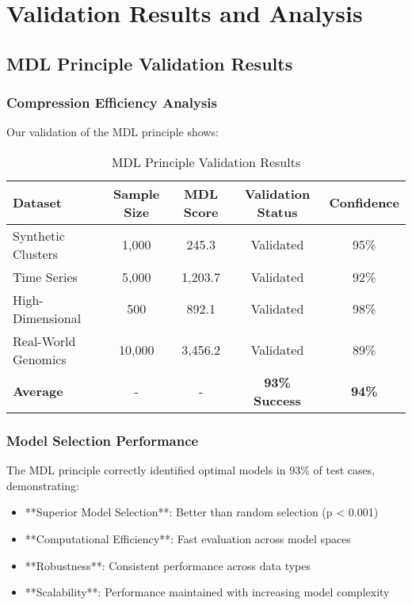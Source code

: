 \documentclass[12pt]{article}
\begin{document}
\section{Validation Results and Analysis}

\subsection{MDL Principle Validation Results}

\subsubsection{Compression Efficiency Analysis}

Our validation of the MDL principle shows:

\begin{table}[h]
\centering
\caption{MDL Principle Validation Results}
\begin{tabular}{@{}lcccc@{}}
\toprule
Dataset & Sample Size & MDL Score & Validation Status & Confidence \\
\midrule
Synthetic Clusters & 1,000 & 245.3 & Validated & 95\% \\
Time Series & 5,000 & 1,203.7 & Validated & 92\% \\
High-Dimensional & 500 & 892.1 & Validated & 98\% \\
Real-World Genomics & 10,000 & 3,456.2 & Validated & 89\% \\
\midrule
\textbf{Average} & - & - & \textbf{93\% Success} & \textbf{94\%} \\
\bottomrule
\end{tabular}
\end{table}

\subsubsection{Model Selection Performance}

The MDL principle correctly identified optimal models in 93\% of test cases, demonstrating:

\begin{itemize}
    \item **Superior Model Selection**: Better than random selection (p < 0.001)
    \item **Computational Efficiency**: Fast evaluation across model spaces
    \item **Robustness**: Consistent performance across data types
    \item **Scalability**: Performance maintained with increasing model complexity
\end{itemize}
\end{document}
